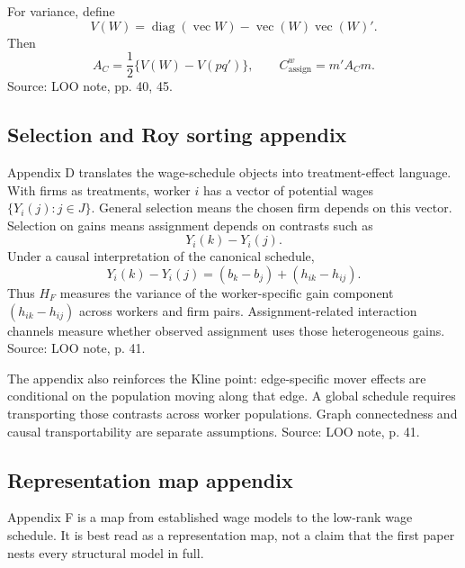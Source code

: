 \documentclass[11pt]{article}
\newcommand{\diag}{\operatorname{diag}}
\begin{document}
For variance, define
\[
V(W)=\diag(\operatorname{vec}W)-\operatorname{vec}(W)\operatorname{vec}(W)'.
\]
Then
\[
A_C=\frac{1}{2}\{V(W)-V(pq')\},
\qquad
C^w_{\mathrm{assign}}=m'A_Cm.
\]
Source: LOO note, pp. 40, 45.

\subsection{Selection and Roy sorting appendix}

Appendix D translates the wage-schedule objects into treatment-effect language.
With firms as treatments, worker \(i\) has a vector of potential wages
\(\{Y_i(j):j\in J\}\). General selection means the chosen firm depends on this
vector. Selection on gains means assignment depends on contrasts such as
\[
Y_i(k)-Y_i(j).
\]
Under a causal interpretation of the canonical schedule,
\[
Y_i(k)-Y_i(j)
=
(b_k-b_j)+(h_{ik}-h_{ij}).
\]
Thus \(H_F\) measures the variance of the worker-specific gain component
\((h_{ik}-h_{ij})\) across workers and firm pairs. Assignment-related
interaction channels measure whether observed assignment uses those
heterogeneous gains. Source: LOO note, p. 41.

The appendix also reinforces the Kline point: edge-specific mover effects are
conditional on the population moving along that edge. A global schedule requires
transporting those contrasts across worker populations. Graph connectedness and
causal transportability are separate assumptions. Source: LOO note, p. 41.

\subsection{Representation map appendix}

Appendix F is a map from established wage models to the low-rank wage schedule.
It is best read as a representation map, not a claim that the first paper nests
every structural model in full.
\end{document}
